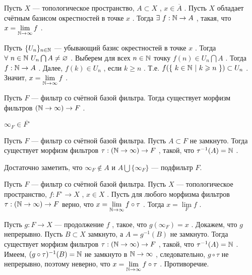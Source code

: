 \SSendp

\SSsect Пусть \( X \) --- топологическое пространство, \( A \subset X \) , \( x \in \overline{A} \) . Пусть \( X \) обладает счётным базисом окрестностей в точке \( x \) . Тогда \( \exists~f:\mathbb{N} \rightarrow A \) , такая, что \( x = \lim\limits_{\mathbb{N} \rightarrow \infty} f \) .

\SSproof

Пусть \( \{U_n\}_{n \in \mathbb{N}} \) --- убывающий базис окрестностей в точке \( x \) . Тогда \( \forall~n \in \mathbb{N}~U_n\bigcap A \neq \varnothing \) . Выберем для всех \( n \in \mathbb{N} \) точку \( f(n) \in U_n\bigcap A \) . Тогда \( f:\mathbb{N} \rightarrow A \) . Далее, \( f(k) \in U_n \) , если \( k \geqslant n \) . Т.е. \( f(\{~k \in \mathbb{N}~|~k \geqslant n~\}) \subset U_n \) . Значит, \( x = \lim\limits_{\mathbb{N} \rightarrow \infty} f \) .

\SSendp

\pagebreak

\SSsect Пусть \( F \) --- фильтр со счётной базой фильтра. Тогда существует морфизм фильтров \( (\mathbb{N} \rightarrow \infty) \rightarrow F \) .

\SSproof

\( \infty_F \in \overline{F^{\circ}} \)

\SSendp

\SSsect Пусть \( F \) --- фильтр со счётной базой фильтра. Пусть \( A \subset F \) не замкнуто. Тогда существует морфизм фильтров \( \tau: (\mathbb{N} \rightarrow \infty) \rightarrow F \) , такой, что \( \tau^{-1}(A) = \mathbb{N} \) .

\SSproof

Достаточно заметить, что \( \infty_F \notin A \) и \( A \bigcup \{\infty_F\} \) --- подфильтр \( F \).

\SSendp

\SSsect Пусть \( F \) --- фильтр со счётной базой фильтра. Пусть \( X \) --- топологическое пространство, \( f:F^{\circ} \rightarrow X \) , \( x \in X \) . Пусть для любого морфизма фильтров \( \tau: (\mathbb{N} \rightarrow \infty) \rightarrow F \) верно, что \( x =  \lim\limits_{\mathbb{N} \rightarrow \infty} f \circ \tau \) . Тогда \( x =  \lim\limits_{F} f \) .

\SSproof

Пусть \( g:F \rightarrow X \) --- продолжение \( f \) , такое, что \( g(\infty_F)=x \) . Докажем, что \( g \) непрерывно. Пусть \( B \subset X \) замкнуто, а \( A = g^{-1}(B) \) не замкнуто. Тогда существует морфизм фильтров \( \tau: (\mathbb{N} \rightarrow \infty) \rightarrow F \) , такой, что \( \tau^{-1}(A) = \mathbb{N} \) . Имеем, \( (g \circ \tau)^{-1}(B) = \mathbb{N} \) не замкнуто в \( \mathbb{N} \rightarrow \infty \) , следовательно, \( g \circ \tau \) не непрерывно, поэтому неверно, что \( x =  \lim\limits_{\mathbb{N} \rightarrow \infty} f \circ \tau \) . Противоречие.

\SSendp


